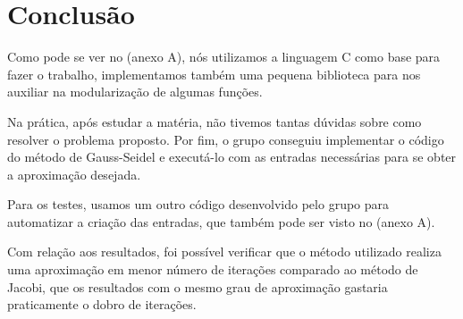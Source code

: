 \chapter*{Conclusão}
Como pode se ver no (anexo A), nós utilizamos a linguagem C como base para fazer o trabalho, implementamos também uma pequena biblioteca para nos auxiliar na modularização de algumas funções.

Na prática, após estudar a matéria, não tivemos tantas dúvidas sobre como resolver o problema proposto. Por fim, o grupo conseguiu implementar o código do método de Gauss-Seidel e executá-lo com as entradas necessárias para se obter a aproximação desejada.

Para os testes, usamos um outro código desenvolvido pelo grupo para automatizar a criação das entradas, que também pode ser visto no (anexo A).

Com relação aos resultados, foi possível verificar que o método utilizado realiza uma aproximação em menor número de iterações comparado ao método de Jacobi, que os resultados com o mesmo grau de aproximação gastaria praticamente o dobro de iterações.